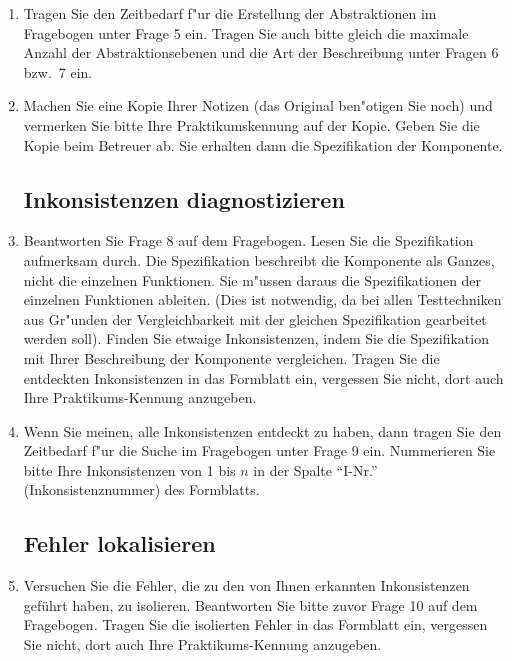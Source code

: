 \begin{enumerate}
\item Tragen Sie den Zeitbedarf f"ur die Erstellung der Abstraktionen
im Fragebogen unter Frage 5 ein.  Tragen Sie auch bitte gleich die
maximale Anzahl der Abstraktionsebenen und die Art der Beschreibung unter
Fragen 6 bzw.~7 ein.   

\item	Machen Sie eine Kopie Ihrer Notizen (das Original ben"otigen Sie noch)
und vermerken Sie bitte Ihre Praktikumskennung auf der Kopie.
Geben Sie die Kopie beim Betreuer ab. 
Sie erhalten dann die Spezifikation der Komponente.

\subsection*{Inkonsistenzen diagnostizieren}

\item Beantworten Sie Frage 8 auf dem Fragebogen.
Lesen Sie die Spezifikation aufmerksam durch. Die Spezifikation beschreibt die
Komponente als Ganzes, nicht die einzelnen Funktionen. Sie m"ussen daraus die 
Spezifikationen der einzelnen Funktionen ableiten.
(Dies ist notwendig, da bei allen Testtechniken aus Gr"unden der 
Vergleichbarkeit mit der gleichen Spezifikation 
gearbeitet werden soll). 
Finden Sie etwaige Inkonsistenzen, indem Sie die Spezifikation mit
Ihrer Beschreibung der Komponente vergleichen. 
Tragen Sie die entdeckten Inkonsistenzen in das Formblatt ein,
vergessen Sie nicht, dort auch Ihre Praktikums-Kennung anzugeben.

\item	Wenn Sie meinen, alle Inkonsistenzen entdeckt zu haben, dann
	tragen Sie den Zeitbedarf f"ur die Suche 
	im Fragebogen unter Frage 9 ein. Nummerieren Sie bitte Ihre Inkonsistenzen
	von 1 bis $n$ in der Spalte "`I-Nr."' (Inkonsistenznummer) des Formblatts.


\subsection*{Fehler lokalisieren}

\item	Versuchen Sie die Fehler, die zu den von Ihnen erkannten
Inkonsistenzen gef\"uhrt haben, zu isolieren. Beantworten Sie bitte
zuvor Frage 10 auf dem Fragebogen.  Tragen Sie die isolierten
Fehler in das Formblatt ein, vergessen Sie nicht, dort auch Ihre
Praktikums-Kennung anzugeben. 


\end{enumerate}
